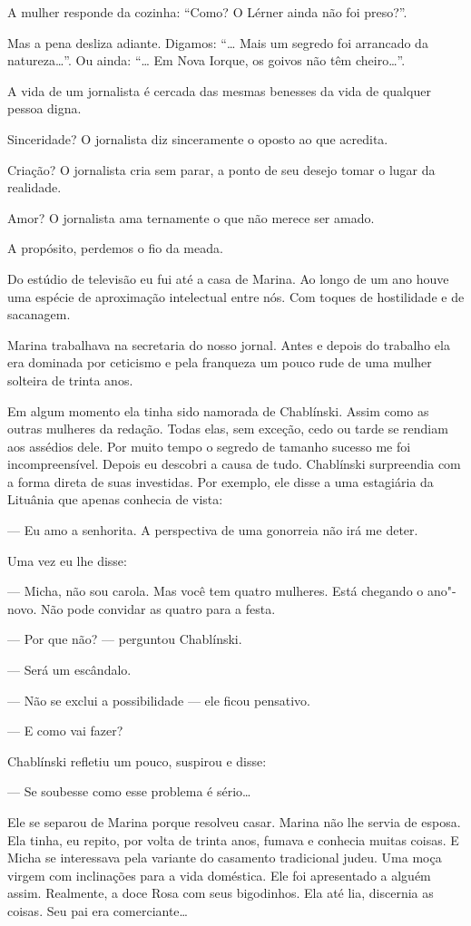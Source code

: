 A mulher responde da cozinha: ``Como? O Lérner ainda não foi preso?''.

Mas a pena desliza adiante. Digamos: ``\ldots{} Mais um segredo foi arrancado
da natureza\ldots{}''. Ou ainda: ``\ldots{} Em Nova Iorque, os goivos não têm
cheiro\ldots{}''.

A vida de um jornalista é cercada das mesmas benesses da vida de
qualquer pessoa digna.

Sinceridade? O jornalista diz sinceramente o oposto ao que acredita.

Criação? O jornalista cria sem parar, a ponto de seu desejo tomar o
lugar da realidade.

Amor? O jornalista ama ternamente o que não merece ser amado.

A propósito, perdemos o fio da meada.

Do estúdio de televisão eu fui até a casa de Marina. Ao longo de um ano
houve uma espécie de aproximação intelectual entre nós. Com toques de
hostilidade e de sacanagem.

Marina trabalhava na secretaria do nosso jornal. Antes e depois do
trabalho ela era dominada por ceticismo e pela franqueza um pouco rude
de uma mulher solteira de trinta anos.

Em algum momento ela tinha sido namorada de Chablínski. Assim como as
outras mulheres da redação. Todas elas, sem exceção, cedo ou tarde se
rendiam aos assédios dele. Por muito tempo o segredo de tamanho
sucesso me foi incompreensível. Depois eu descobri a causa de tudo.
Chablínski surpreendia com a forma direta de suas investidas. Por
exemplo, ele disse a uma estagiária da Lituânia que apenas conhecia de
vista:

--- Eu amo a senhorita. A perspectiva de uma gonorreia não irá me deter.

Uma vez eu lhe disse:

--- Micha, não sou carola. Mas você tem quatro mulheres. Está chegando o
ano"-novo. Não pode convidar as quatro para a festa.

--- Por que não? --- perguntou Chablínski.

--- Será um escândalo.

--- Não se exclui a possibilidade --- ele ficou pensativo.

--- E como vai fazer?

Chablínski refletiu um pouco, suspirou e disse:

--- Se soubesse como esse problema é sério\ldots{}

Ele se separou de Marina porque resolveu casar. Marina não lhe servia de
esposa. Ela tinha, eu repito, por volta de trinta anos, fumava e
conhecia muitas coisas. E Micha se interessava pela variante do
casamento tradicional judeu. Uma moça virgem com inclinações para a vida
doméstica. Ele foi apresentado a alguém assim. Realmente, a doce Rosa
com seus bigodinhos. Ela até lia, discernia as coisas. Seu pai era
comerciante\ldots{}

